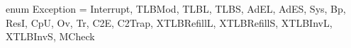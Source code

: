 enum Exception =
{
   Interrupt, TLBMod, TLBL, TLBS, AdEL, AdES, Sys, Bp, ResI, CpU, Ov, Tr, C2E, C2Trap,
   XTLBRefillL, XTLBRefillS, XTLBInvL, XTLBInvS, MCheck
}
